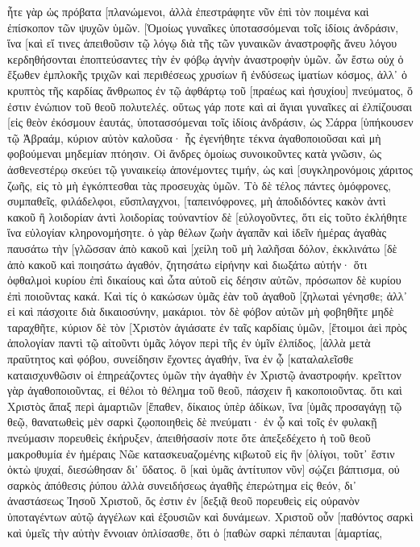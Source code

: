 ἦτε γὰρ ὡς πρόβατα [πλανώμενοι, ἀλλὰ ἐπεστράφητε νῦν ἐπὶ τὸν ποιμένα καὶ ἐπίσκοπον τῶν ψυχῶν ὑμῶν. 
[Ὁμοίως γυναῖκες ὑποτασσόμεναι τοῖς ἰδίοις ἀνδράσιν, ἵνα [καὶ εἴ τινες ἀπειθοῦσιν τῷ λόγῳ διὰ τῆς τῶν γυναικῶν ἀναστροφῆς ἄνευ λόγου κερδηθήσονται 
ἐποπτεύσαντες τὴν ἐν φόβῳ ἁγνὴν ἀναστροφὴν ὑμῶν. 
ὧν ἔστω οὐχ ὁ ἔξωθεν ἐμπλοκῆς τριχῶν καὶ περιθέσεως χρυσίων ἢ ἐνδύσεως ἱματίων κόσμος, 
ἀλλ᾽ ὁ κρυπτὸς τῆς καρδίας ἄνθρωπος ἐν τῷ ἀφθάρτῳ τοῦ [πραέως καὶ ἡσυχίου] πνεύματος, ὅ ἐστιν ἐνώπιον τοῦ θεοῦ πολυτελές. 
οὕτως γάρ ποτε καὶ αἱ ἅγιαι γυναῖκες αἱ ἐλπίζουσαι [εἰς θεὸν ἐκόσμουν ἑαυτάς, ὑποτασσόμεναι τοῖς ἰδίοις ἀνδράσιν, 
ὡς Σάρρα [ὑπήκουσεν τῷ Ἀβραάμ, κύριον αὐτὸν καλοῦσα· ἧς ἐγενήθητε τέκνα ἀγαθοποιοῦσαι καὶ μὴ φοβούμεναι μηδεμίαν πτόησιν. 
Οἱ ἄνδρες ὁμοίως συνοικοῦντες κατὰ γνῶσιν, ὡς ἀσθενεστέρῳ σκεύει τῷ γυναικείῳ ἀπονέμοντες τιμήν, ὡς καὶ [συγκληρονόμοις χάριτος ζωῆς, εἰς τὸ μὴ ἐγκόπτεσθαι τὰς προσευχὰς ὑμῶν. 
Τὸ δὲ τέλος πάντες ὁμόφρονες, συμπαθεῖς, φιλάδελφοι, εὔσπλαγχνοι, [ταπεινόφρονες, 
μὴ ἀποδιδόντες κακὸν ἀντὶ κακοῦ ἢ λοιδορίαν ἀντὶ λοιδορίας τοὐναντίον δὲ [εὐλογοῦντες, ὅτι εἰς τοῦτο ἐκλήθητε ἵνα εὐλογίαν κληρονομήσητε. 
ὁ γὰρ θέλων ζωὴν ἀγαπᾶν καὶ ἰδεῖν ἡμέρας ἀγαθὰς παυσάτω τὴν [γλῶσσαν ἀπὸ κακοῦ καὶ [χείλη τοῦ μὴ λαλῆσαι δόλον, 
ἐκκλινάτω [δὲ ἀπὸ κακοῦ καὶ ποιησάτω ἀγαθόν, ζητησάτω εἰρήνην καὶ διωξάτω αὐτήν· 
ὅτι ὀφθαλμοὶ κυρίου ἐπὶ δικαίους καὶ ὦτα αὐτοῦ εἰς δέησιν αὐτῶν, πρόσωπον δὲ κυρίου ἐπὶ ποιοῦντας κακά. 
Καὶ τίς ὁ κακώσων ὑμᾶς ἐὰν τοῦ ἀγαθοῦ [ζηλωταὶ γένησθε; 
ἀλλ᾽ εἰ καὶ πάσχοιτε διὰ δικαιοσύνην, μακάριοι. τὸν δὲ φόβον αὐτῶν μὴ φοβηθῆτε μηδὲ ταραχθῆτε, 
κύριον δὲ τὸν [Χριστὸν ἁγιάσατε ἐν ταῖς καρδίαις ὑμῶν, [ἕτοιμοι ἀεὶ πρὸς ἀπολογίαν παντὶ τῷ αἰτοῦντι ὑμᾶς λόγον περὶ τῆς ἐν ὑμῖν ἐλπίδος, 
[ἀλλὰ μετὰ πραΰτητος καὶ φόβου, συνείδησιν ἔχοντες ἀγαθήν, ἵνα ἐν ᾧ [καταλαλεῖσθε καταισχυνθῶσιν οἱ ἐπηρεάζοντες ὑμῶν τὴν ἀγαθὴν ἐν Χριστῷ ἀναστροφήν. 
κρεῖττον γὰρ ἀγαθοποιοῦντας, εἰ θέλοι τὸ θέλημα τοῦ θεοῦ, πάσχειν ἢ κακοποιοῦντας. 
ὅτι καὶ Χριστὸς ἅπαξ περὶ ἁμαρτιῶν [ἔπαθεν, δίκαιος ὑπὲρ ἀδίκων, ἵνα [ὑμᾶς προσαγάγῃ τῷ θεῷ, θανατωθεὶς μὲν σαρκὶ ζῳοποιηθεὶς δὲ πνεύματι· 
ἐν ᾧ καὶ τοῖς ἐν φυλακῇ πνεύμασιν πορευθεὶς ἐκήρυξεν, 
ἀπειθήσασίν ποτε ὅτε ἀπεξεδέχετο ἡ τοῦ θεοῦ μακροθυμία ἐν ἡμέραις Νῶε κατασκευαζομένης κιβωτοῦ εἰς ἣν [ὀλίγοι, τοῦτ᾽ ἔστιν ὀκτὼ ψυχαί, διεσώθησαν δι᾽ ὕδατος. 
ὃ [καὶ ὑμᾶς ἀντίτυπον νῦν] σῴζει βάπτισμα, οὐ σαρκὸς ἀπόθεσις ῥύπου ἀλλὰ συνειδήσεως ἀγαθῆς ἐπερώτημα εἰς θεόν, δι᾽ ἀναστάσεως Ἰησοῦ Χριστοῦ, 
ὅς ἐστιν ἐν [δεξιᾷ θεοῦ πορευθεὶς εἰς οὐρανὸν ὑποταγέντων αὐτῷ ἀγγέλων καὶ ἐξουσιῶν καὶ δυνάμεων. 
Χριστοῦ οὖν [παθόντος σαρκὶ καὶ ὑμεῖς τὴν αὐτὴν ἔννοιαν ὁπλίσασθε, ὅτι ὁ [παθὼν σαρκὶ πέπαυται [ἁμαρτίας, 
